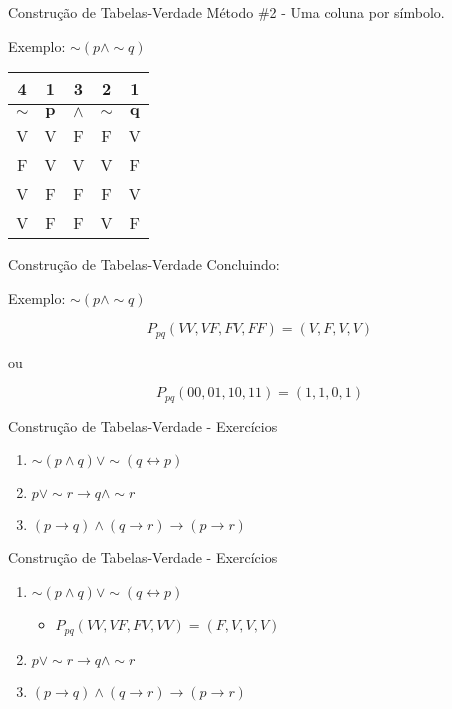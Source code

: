 \begin{frame}[t]{Construção de Tabelas-Verdade} %
	Método \#2 - Uma coluna por símbolo.
	
	\begin{center}
	Exemplo: $\sim (p \wedge \sim q)$
	
	\vskip 0.8cm
		
	\begin{tabular}{|c|c|c|c|c|}
	\hline
	{\tiny 4} & {\tiny 1} & {\tiny 3} & {\tiny 2} & {\tiny 1} \\
	\hline
	\hline
	$\mathbf{\sim}$ & $\mathbf{p}$ & $\mathbf{\wedge}$ & $\mathbf{\sim}$ & $\mathbf{q}$ \\
	\hline
	V & V & F & F & V \\
	\hline
	F & V & V & V & F \\
	\hline
	V & F & F & F & V \\
	\hline
	V & F & F & V & F \\
	\hline
	\end{tabular}
	\end{center}
\end{frame}

\begin{frame}[t]{Construção de Tabelas-Verdade} %
	Concluindo:
	
	\begin{center}Exemplo: $\sim (p \wedge \sim q)$\end{center}

	$$P_{pq}(VV, VF, FV, FF) = (V, F, V, V)$$

	\begin{center}ou\end{center}

	$$P_{pq}(00, 01, 10, 11) = (1, 1, 0, 1)$$
\end{frame}

\begin{frame}[t]{Construção de Tabelas-Verdade - Exercícios} %
	\begin{enumerate}
	\item $\sim (p \wedge q) \vee\sim (q \leftrightarrow p)$
	\item $p \vee\sim r \rightarrow q \wedge\sim r$
	\item $(p \rightarrow q) \wedge (q \rightarrow r) \rightarrow (p \rightarrow r)$
	\end{enumerate}
\end{frame}

\begin{frame}[t]{Construção de Tabelas-Verdade - Exercícios} %
	\begin{enumerate}
	\item $\sim (p \wedge q) \vee\sim (q \leftrightarrow p)$
	   \begin{itemize} \item $P_{pq}(VV, VF, FV, VV) = (F, V, V, V)$ \end{itemize}
	\item $p \vee\sim r \rightarrow q \wedge\sim r$
	\item $(p \rightarrow q) \wedge (q \rightarrow r) \rightarrow (p \rightarrow r)$
	\end{enumerate}
\end{frame}

